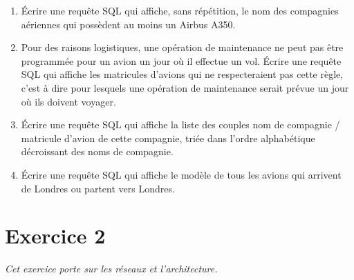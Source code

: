 \documentclass[11pt,a4paper,french,twoside]{PMCours}
\begin{document}
\begin{enumerate}
\item Écrire une requête SQL qui affiche, sans répétition, le nom des compagnies aériennes qui possèdent au moins un Airbus A350.
\item Pour des raisons logistiques, une opération de maintenance ne peut pas être programmée pour un avion un jour où il effectue un vol. Écrire une requête SQL qui affiche les matricules d'avions qui ne respecteraient pas cette règle, c'est à dire pour lesquels une opération de maintenance serait prévue un jour où ils doivent voyager. 
\item Écrire une requête SQL qui affiche la liste des couples nom de compagnie / matricule d'avion de cette compagnie, triée dans l'ordre alphabétique décroissant des noms de compagnie.
\item Écrire une requête SQL qui affiche le modèle de tous les avions qui arrivent de Londres ou partent vers Londres.
\end{enumerate}


\newpage
\section*{Exercice 2}
\emph{Cet exercice porte sur les réseaux et l'architecture.}

\medskip
\end{document}
